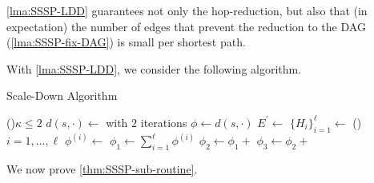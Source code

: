 \begin{intuition}
	\autoref{lma:SSSP-LDD} guarantees not only the hop-reduction, but also that (in expectation) the number of edges that prevent the reduction to the DAG (\autoref{lma:SSSP-fix-DAG}) is small per shortest path.
\end{intuition}

With \autoref{lma:SSSP-LDD}, we consider the following algorithm.

\begin{algorithm}[H]\label{algo:scale-down}
	\DontPrintSemicolon{}
	\caption{Scale-Down Algorithm}

	\BlankLine

	\If(\label{algo:scale-down-base}){\(\kappa \leq 2\)}{
		\(d(s, \cdot)\gets\) with \(2\) iterations
		\(\phi \gets d(s, \cdot)\)\;
		\Return{\(\phi \)}\;
	}
	\;
	\(E^{\prime} \gets\)\label{algo:scale-down-LDD}\;
	\(\{ H_i \} _{i=1}^{\ell }\gets\)\;
	\;
	\For(){\(i = 1, \dots , \ell \)}{
		\(\phi ^{(i)}\gets\)\label{algo:scale-down-recurse}\;
	}
	\;
	\(\phi _1 \gets \sum_{i=1}^{\ell } \phi ^{(i)}\)\;
	\(\phi _2 \gets \phi _1 + \)\label{algo:scale-down-fix-DAG}
	\(\phi _3 \gets \phi _2 + \)\label{algo:scale-down-fix-bad-edge}
	\;
\end{algorithm}

We now prove \autoref{thm:SSSP-sub-routine}.

